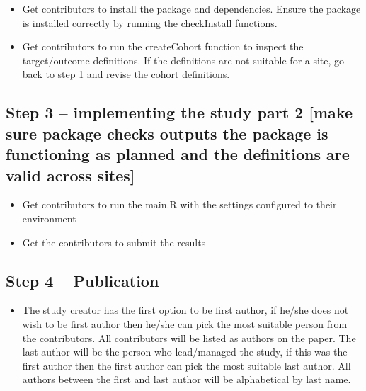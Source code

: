 \documentclass[
]{article}
\providecommand{\tightlist}{%
  \setlength{\itemsep}{0pt}\setlength{\parskip}{0pt}}
\begin{document}
\begin{itemize}
\tightlist
\item
  Get contributors to install the package and dependencies. Ensure the
  package is installed correctly by running the checkInstall functions.
\item
  Get contributors to run the createCohort function to inspect the
  target/outcome definitions. If the definitions are not suitable for a
  site, go back to step 1 and revise the cohort definitions.
\end{itemize}

\hypertarget{step-3-implementing-the-study-part-2-make-sure-package-checks-outputs-the-package-is-functioning-as-planned-and-the-definitions-are-valid-across-sites}{%
\subsection{Step 3 -- implementing the study part 2 {[}make sure package
checks outputs the package is functioning as planned and the definitions
are valid across
sites{]}}\label{step-3-implementing-the-study-part-2-make-sure-package-checks-outputs-the-package-is-functioning-as-planned-and-the-definitions-are-valid-across-sites}}

\begin{itemize}
\tightlist
\item
  Get contributors to run the main.R with the settings configured to
  their environment
\item
  Get the contributors to submit the results
\end{itemize}

\hypertarget{step-4-publication}{%
\subsection{Step 4 -- Publication}\label{step-4-publication}}

\begin{itemize}
\tightlist
\item
  The study creator has the first option to be first author, if he/she
  does not wish to be first author then he/she can pick the most
  suitable person from the contributors. All contributors will be listed
  as authors on the paper. The last author will be the person who
  lead/managed the study, if this was the first author then the first
  author can pick the most suitable last author. All authors between the
  first and last author will be alphabetical by last name.
\end{itemize}
\end{document}
